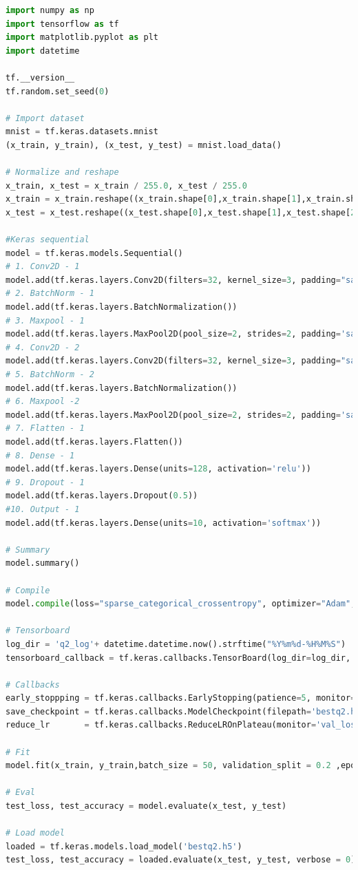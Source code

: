 \documentclass[11pt]{article}
\begin{document}
\begin{lstlisting}[language=Python, basicstyle=\tiny, caption=Modified CNN architecture with KERAS Sequential model for mnist classification]
import numpy as np
import tensorflow as tf
import matplotlib.pyplot as plt
import datetime

tf.__version__
tf.random.set_seed(0)

# Import dataset
mnist = tf.keras.datasets.mnist
(x_train, y_train), (x_test, y_test) = mnist.load_data()

# Normalize and reshape
x_train, x_test = x_train / 255.0, x_test / 255.0
x_train = x_train.reshape((x_train.shape[0],x_train.shape[1],x_train.shape[2],1))
x_test = x_test.reshape((x_test.shape[0],x_test.shape[1],x_test.shape[2],1))

#Keras sequential
model = tf.keras.models.Sequential()
# 1. Conv2D - 1
model.add(tf.keras.layers.Conv2D(filters=32, kernel_size=3, padding="same", activation="relu", input_shape=(28,28,1)))
# 2. BatchNorm - 1
model.add(tf.keras.layers.BatchNormalization())
# 3. Maxpool - 1
model.add(tf.keras.layers.MaxPool2D(pool_size=2, strides=2, padding='same'))
# 4. Conv2D - 2
model.add(tf.keras.layers.Conv2D(filters=32, kernel_size=3, padding="same", activation="relu"))
# 5. BatchNorm - 2
model.add(tf.keras.layers.BatchNormalization())
# 6. Maxpool -2
model.add(tf.keras.layers.MaxPool2D(pool_size=2, strides=2, padding='same'))
# 7. Flatten - 1
model.add(tf.keras.layers.Flatten())
# 8. Dense - 1
model.add(tf.keras.layers.Dense(units=128, activation='relu'))
# 9. Dropout - 1
model.add(tf.keras.layers.Dropout(0.5))
#10. Output - 1
model.add(tf.keras.layers.Dense(units=10, activation='softmax'))

# Summary
model.summary()

# Compile
model.compile(loss="sparse_categorical_crossentropy", optimizer="Adam", metrics=["sparse_categorical_accuracy"])

# Tensorboard
log_dir = 'q2_log'+ datetime.datetime.now().strftime("%Y%m%d-%H%M%S")
tensorboard_callback = tf.keras.callbacks.TensorBoard(log_dir=log_dir, histogram_freq=1, write_graph=True, write_images=True)

# Callbacks
early_stoppping = tf.keras.callbacks.EarlyStopping(patience=5, monitor='val_loss', min_delta=1e-4, verbose=1)
save_checkpoint = tf.keras.callbacks.ModelCheckpoint(filepath='bestq2.h5', save_best_only=True, monitor='val_loss', verbose=1)
reduce_lr       = tf.keras.callbacks.ReduceLROnPlateau(monitor='val_loss', factor=0.2,patience=2, min_lr=1e-2, verbose=1)

# Fit
model.fit(x_train, y_train,batch_size = 50, validation_split = 0.2 ,epochs=5000, callbacks=[tensorboard_callback, early_stoppping, save_checkpoint, reduce_lr])

# Eval
test_loss, test_accuracy = model.evaluate(x_test, y_test)

# Load model
loaded = tf.keras.models.load_model('bestq2.h5')
test_loss, test_accuracy = loaded.evaluate(x_test, y_test, verbose = 0)
\end{lstlisting}
\end{document}

